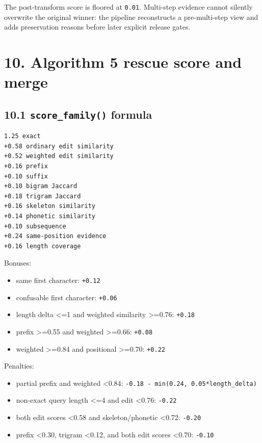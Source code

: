 The post-transform score is floored at \texttt{0.01}. Multi-step evidence cannot silently overwrite the original winner: the pipeline reconstructs a pre-multi-step view and adds preservation reasons before later explicit release gates.

\section{10. Algorithm 5 rescue score and merge}\label{10-algorithm-5-rescue-score-and-merge}

\subsection{\texorpdfstring{10.1 \texttt{score\_\allowbreak{}family()} formula}{10.1 score\_\allowbreak{}family() formula}}\label{101-score_family-formula}

\begin{verbatim}
1.25 exact
+0.58 ordinary edit similarity
+0.52 weighted edit similarity
+0.16 prefix
+0.10 suffix
+0.10 bigram Jaccard
+0.18 trigram Jaccard
+0.16 skeleton similarity
+0.14 phonetic similarity
+0.10 subsequence
+0.24 same-position evidence
+0.16 length coverage
\end{verbatim}

Bonuses:

\begin{itemize}
\tightlist
\item
  same first character: \texttt{+0.12}
\item
  confusable first character: \texttt{+0.06}
\item
  length delta \textless=1 and weighted similarity \textgreater=0.76: \texttt{+0.18}
\item
  prefix \textgreater=0.55 and weighted \textgreater=0.66: \texttt{+0.08}
\item
  weighted \textgreater=0.84 and positional \textgreater=0.70: \texttt{+0.22}
\end{itemize}

Penalties:

\begin{itemize}
\tightlist
\item
  partial prefix and weighted \textless0.84: \texttt{-0.18\ -\ min(0.24,\ 0.05*length\_\allowbreak{}delta)}
\item
  non-exact query length \textless=4 and edit \textless0.76: \texttt{-0.22}
\item
  both edit scores \textless0.58 and skeleton/phonetic \textless0.72: \texttt{-0.20}
\item
  prefix \textless0.30, trigram \textless0.12, and both edit scores \textless0.70: \texttt{-0.10}
\end{itemize}

